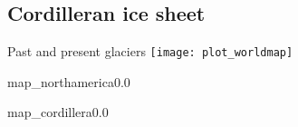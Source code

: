 \subsection{Cordilleran ice sheet}

    \begin{frame}{Past and present glaciers}
      \centering
      \texttt{[image: plot\_worldmap]}
    \end{frame}

    \begin{backgroundframe}{map_northamerica}{0.0}{}
    \end{backgroundframe}

    \begin{backgroundframe}{map_cordillera}{0.0}{}
    \end{backgroundframe}



